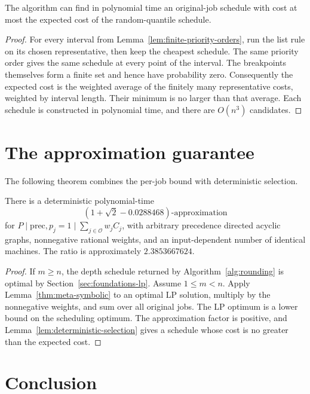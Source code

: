 \begin{lemma}
\label{lem:deterministic-selection}
The algorithm can find in polynomial time an original-job schedule with
cost at most the expected cost of the random-quantile schedule.
\end{lemma}
\begin{proof}
For every interval from Lemma~\ref{lem:finite-priority-orders}, run the
list rule on its chosen representative, then keep the cheapest schedule.
The same priority order gives the same schedule at every point of the
interval. The breakpoints themselves form a finite set and hence have
probability zero. Consequently the expected cost is the weighted average
of the finitely many representative costs, weighted by interval length.
Their minimum is no larger than that average. Each schedule is
constructed in polynomial time, and there are $O(n^3)$ candidates.
\end{proof}

\section{The approximation guarantee}

The following theorem combines the per-job bound with deterministic
selection.

\begin{theorem}
\label{thm:final}
There is a deterministic polynomial-time
\[
 \left(1+\sqrt2-0.0288468\right)
 \text{-approximation}
\]
for $P\mid\mathrm{prec},p_j=1\mid\sum_{j\in\mathcal O} w_j C_j$,
with arbitrary precedence directed acyclic graphs, nonnegative rational weights, and an
input-dependent number of identical machines. The ratio is approximately
$2.3853667624$.
\end{theorem}
\begin{proof}
If $m\ge n$, the depth schedule returned by Algorithm~\ref{alg:rounding}
is optimal by Section~\ref{sec:foundations-lp}. Assume $1\le m<n$.
Apply Lemma~\ref{thm:meta-symbolic} to an optimal LP solution,
multiply by the nonnegative weights, and sum over all original jobs. The
LP optimum is a lower bound on the scheduling optimum. The approximation
factor is positive, and Lemma~\ref{lem:deterministic-selection} gives a
schedule whose cost is no greater than the expected cost.
\end{proof}

\section{Conclusion}

